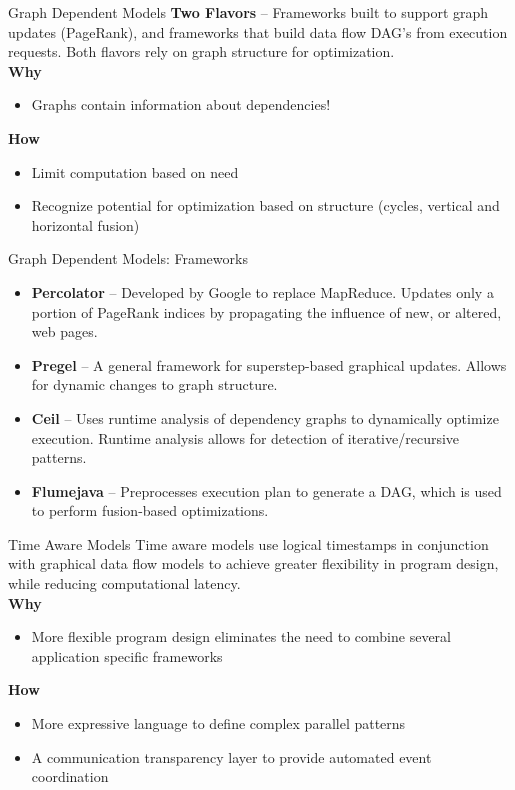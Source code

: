 \documentclass{beamer}
\begin{document}
\begin{frame}{Graph Dependent Models}
\textbf{Two Flavors} -- Frameworks built to support graph updates (PageRank), and frameworks that build data flow DAG's from execution requests.  Both flavors rely on graph structure for optimization.\\
\vspace{.1cm}
\textbf{Why}
\begin{itemize}
\item Graphs contain information about dependencies!
\end{itemize}
\textbf{How}
\begin{itemize}
\item Limit computation based on need
\item Recognize potential for optimization based on structure (cycles, vertical and horizontal fusion)
\end{itemize}

\end{frame}

\begin{frame}{Graph Dependent Models: Frameworks}

\begin{itemize}
\item \textbf{Percolator} -- Developed by Google to replace MapReduce.  Updates only a portion of PageRank indices by propagating the influence of new, or altered, web pages.
\item \textbf{Pregel} -- A general framework for superstep-based graphical updates.  Allows for dynamic changes to graph structure.
\item \textbf{Ceil} -- Uses runtime analysis of dependency graphs to dynamically optimize execution.  Runtime analysis allows for detection of iterative/recursive patterns.
\item \textbf{Flumejava} -- Preprocesses execution plan to generate a DAG, which is used to perform fusion-based optimizations.
\end{itemize}

\end{frame}


\begin{frame}{Time Aware Models}
Time aware models use logical timestamps in conjunction with graphical data flow models to achieve greater flexibility in program design, while reducing computational latency.\\
\vspace{.1cm}
\textbf{Why}
\begin{itemize}
\item More flexible program design eliminates the need to combine several application specific frameworks
\end{itemize}
\textbf{How}
\begin{itemize}
\item More expressive language to define complex parallel patterns
\item A communication transparency layer to provide automated event coordination
\end{itemize}

\end{frame}
\end{document}
